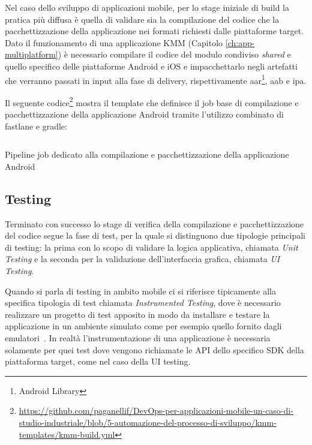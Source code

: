Nel caso dello sviluppo di applicazioni mobile, per lo stage iniziale di build la pratica più diffusa è quella di validare sia la compilazione del codice che la pacchettizzazione della applicazione nei formati richiesti dalle piattaforme target. Dato il funzionamento di una applicazione KMM (Capitolo \ref{ch:app-multiplatform}) è necessario compilare il codice del modulo condiviso \textit{shared} e quello specifico delle piattaforme Android e iOS e impacchettarlo negli artefatti che verranno passati in input alla fase di delivery, rispettivamente aar\footnote{Android Library}, aab e ipa.

Il seguente codice\footnote{\href{https://github.com/paganellif/DevOps-per-applicazioni-mobile-un-caso-di-studio-industriale/blob/5-automazione-del-processo-di-sviluppo/kmm-templates/kmm-build.yml}{https://github.com/paganellif/DevOps-per-applicazioni-mobile-un-caso-di-studio-industriale/blob/5-automazione-del-processo-di-sviluppo/kmm-templates/kmm-build.yml}} mostra il template che definisce il job base di compilazione e pacchettizzazione della applicazione Android tramite l'utilizzo combinato di fastlane e gradle:
\begin{listing}[H]
    \inputminted{yaml}{code/build-job.yaml}
    \caption{Pipeline job dedicato alla compilazione e pacchettizzazione della applicazione Android}
\end{listing}

\subsection{Testing}
Terminato con successo lo stage di verifica della compilazione e pacchettizzazione del codice segue la fase di test, per la quale si distinguono due tipologie principali di testing: la prima con lo scopo di validare la logica applicativa, chiamata \textit{Unit Testing} e la seconda per la validazione dell'interfaccia grafica, chiamata \textit{UI Testing}.

Quando si parla di testing in ambito mobile ci si riferisce tipicamente alla specifica tipologia di test chiamata \textit{Instrumented Testing}, dove è necessario realizzare un progetto di test apposito in modo da installare e testare la applicazione in un ambiente simulato come per esempio quello fornito dagli emulatori~\cite{darwin2011android}. In realtà l'instrumentazione di una applicazione è necessaria solamente per quei test dove vengono richiamate le API dello specifico SDK della piattaforma target, come nel caso della UI testing.

